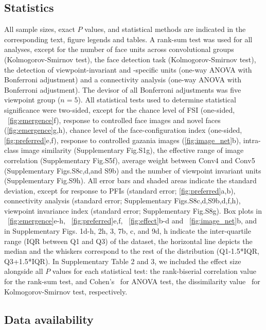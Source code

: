 \documentclass[sn-mathphys-num]{sn-jnl}%
\theoremstyle{thmstyleone}%
\theoremstyle{thmstyletwo}%
\theoremstyle{thmstylethree}%
\begin{document}
\subsection{Statistics}
All sample sizes, exact $ P $ values, and statistical methods are indicated in the corresponding text, figure legends and tables.
A rank-sum test was used for all analyses, 
except for the number of face units across convolutional groups (Kolmogorov-Smirnov test),
the face detection task (Kolmogorov-Smirnov test),
the detection of viewpoint-invariant and -specific units (one-way ANOVA with Bonferroni adjustment)
and a connectivity analysis (one-way ANOVA with Bonferroni adjustment).
The devisor of all Bonferroni adjustments was five viewpoint group ($ n = 5 $).
All statistical tests used to determine statistical significance were two-sided, except for the chance level of FSI (one-sided, ~\ref{fig:emergence}f),
response to controlled face images and novel faces (\ref{fig:emergence}g,h),
chance level of the face-configuration index (one-sided, \ref{fig:preferred}e,f),
response to controlled gazania images (\ref{fig:image_net}b),
intra-class image similarity (Supplementary Fig.S1g),
the effective range of image correlation (Supplementary Fig.S5f),
average weight between Conv4 and Conv5 (Supplementary Figs.S8c,d,and S9b)
and the number of viewpoint invariant units (Supplementary Fig.S9h).
All error bars and shaded areas indicate the standard deviation, 
except for response to PFIs (standard error; \ref{fig:preferred}a,b),
connectivity analysis (standard error; Supplementary Figs.S8c,d,S9b,d,f,h),
viewpoint invariance index (standard error; Supplementary Fig.S8g).
Box plots in ~\ref{fig:emergence}e-h, ~\ref{fig:preferred}e,f, ~\ref{fig:effect}b-d and ~\ref{fig:image_net}b, and in Supplementary Figs. 1d-h, 2h, 3, 7b, c, and 9d, h indicate the inter-quartile range (IQR between Q1 and Q3) of the dataset, 
the horizontal line depicts the median and the whiskers correspond to the rest of the distribution (Q1-1.5*IQR, Q3+1.5*IQR).
In Supplementary Table 2 and 3, we included the effect size alongside all $ P $ values for each statistical test:
the rank-biserial correlation value~\cite{cureton1956rank} for the rank-sum test, 
and Cohen's~\cite{tsao2008comparing} for ANOVA test, the dissimilarity value~\cite{vermeesch2013multi} for Kolmogorov-Smirnov test, respectively.


\subsection{Data availability} \label{sec:data_availability}
\end{document}
